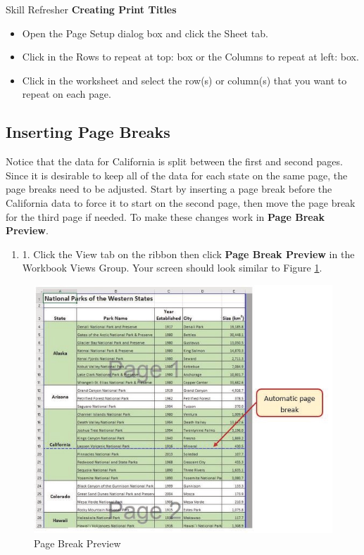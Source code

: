 \begin{center}
	\begin{sklbox}{Skill Refresher}
		\textbf{Creating Print Titles}
		\\
		\begin{itemize}
			\setlength{\itemsep}{0pt}
			\setlength{\parskip}{0pt}
			\setlength{\parsep}{0pt}

			\item Open the Page Setup dialog box and click the Sheet tab.
			\item Click in the Rows to repeat at top: box or the Columns to repeat at left: box.
			\item Click in the worksheet and select the row(s) or column(s) that you want to repeat on each page.
						
		\end{itemize}
	\end{sklbox}
\end{center}

\subsection{Inserting Page Breaks}

Notice that the data for California is split between the first and second pages. Since it is desirable to keep all of the data for each state on the same page, the page breaks need to be adjusted. Start by inserting a page break before the California data to force it to start on the second page, then move the page break for the third page if needed. To make these changes work in \textbf{Page Break Preview}.

\begin{enumerate}
	\item 1. Click the View tab on the ribbon then click \textbf{Page Break Preview} in the Workbook Views Group. Your screen should look similar to Figure \ref{03:fig30}.
\end{enumerate}

\begin{figure}[H]
	\centering
	\includegraphics[width=\maxwidth{.95\linewidth}]{gfx/ch03_fig30}
	\caption{Page Break Preview}
	\label{03:fig30}
\end{figure}

